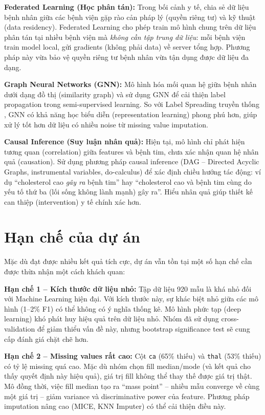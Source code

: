 \textbf{Federated Learning (Học phân tán):} Trong bối cảnh y tế, chia sẻ dữ liệu bệnh nhân giữa các bệnh viện gặp rào cản pháp lý (quyền riêng tư) và kỹ thuật (data residency). Federated Learning cho phép train mô hình chung trên dữ liệu phân tán tại nhiều bệnh viện mà \textit{không cần tập trung dữ liệu}: mỗi bệnh viện train model local, gửi gradients (không phải data) về server tổng hợp. Phương pháp này vừa bảo vệ quyền riêng tư bệnh nhân vừa tận dụng được dữ liệu đa dạng.

\textbf{Graph Neural Networks (GNN):} Mô hình hóa mối quan hệ giữa bệnh nhân dưới dạng đồ thị (similarity graph) và sử dụng GNN để cải thiện label propagation trong semi-supervised learning. So với Label Spreading truyền thống \cite{zhou2004learning}, GNN có khả năng học biểu diễn (representation learning) phong phú hơn, giúp xử lý tốt hơn dữ liệu có nhiều noise từ missing value imputation.

\textbf{Causal Inference (Suy luận nhân quả):} Hiện tại, mô hình chỉ phát hiện tương quan (correlation) giữa features và bệnh tim, chưa xác nhận quan hệ nhân quả (causation). Sử dụng phương pháp causal inference (DAG -- Directed Acyclic Graphs, instrumental variables, do-calculus) để xác định chiều hướng tác động: ví dụ ``cholesterol cao \textit{gây ra} bệnh tim'' hay ``cholesterol cao và bệnh tim cùng do yếu tố thứ ba (lối sống không lành mạnh) gây ra''. Hiểu nhân quả giúp thiết kế can thiệp (intervention) y tế chính xác hơn.

\section{Hạn chế của dự án}

Mặc dù đạt được nhiều kết quả tích cực, dự án vẫn tồn tại một số hạn chế cần được thừa nhận một cách khách quan:

\textbf{Hạn chế 1 -- Kích thước dữ liệu nhỏ:} Tập dữ liệu 920 mẫu là khá nhỏ đối với Machine Learning hiện đại. Với kích thước này, sự khác biệt nhỏ giữa các mô hình (1--2\% F1) có thể không có ý nghĩa thống kê. Mô hình phức tạp (deep learning) khó phát huy hiệu quả trên dữ liệu nhỏ. Nhóm đã sử dụng cross-validation để giảm thiểu vấn đề này, nhưng bootstrap significance test sẽ cung cấp đánh giá chặt chẽ hơn.

\textbf{Hạn chế 2 -- Missing values rất cao:} Cột \texttt{ca} (65\% thiếu) và \texttt{thal} (53\% thiếu) có tỷ lệ missing quá cao. Mặc dù nhóm chọn fill median/mode (và kết quả cho thấy quyết định này hiệu quả), giá trị fill không thể thay thế được giá trị thật. Mô đồng thời, việc fill median tạo ra ``mass point'' -- nhiều mẫu converge về cùng một giá trị -- giảm variance và discriminative power của feature. Phương pháp imputation nâng cao (MICE, KNN Imputer) có thể cải thiện điều này.

